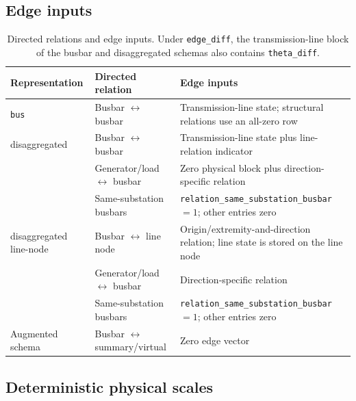 \subsection{Edge inputs}
\label{sec:gnn-edge-input-inventory}

\begin{table}[H]
  \centering
  \scriptsize
  \caption{Directed relations and edge inputs. Under \texttt{edge\_diff},
  the transmission-line block of the busbar and disaggregated schemas also
  contains \texttt{theta\_diff}.}
  \label{tab:gine-gat-edge-inventory}
  \label{tab:graph-edge-features}
  \label{tab:heterogeneous-edge-features}
  \label{tab:heterogeneous-line-edge-features}
  \label{tab:same-substation-augmentation-features}
  \setlength{\tabcolsep}{3pt}
  \begin{tabular}{L{0.18\textwidth}L{0.28\textwidth}L{0.45\textwidth}}
    \toprule
    Representation & Directed relation & Edge inputs \\
    \midrule
    \texttt{bus} & Busbar $\leftrightarrow$ busbar & Transmission-line state; structural relations use an all-zero row \\
    \midrule
    disaggregated & Busbar $\leftrightarrow$ busbar & Transmission-line state plus line-relation indicator \\
     & Generator/load $\leftrightarrow$ busbar & Zero physical block plus direction-specific relation \\
     & Same-substation busbars & \texttt{relation\_same\_substation\_busbar}$=1$; other entries zero \\
    \midrule
    disaggregated line-node & Busbar $\leftrightarrow$ line node & Origin/extremity-and-direction relation; line state is stored on the line node \\
     & Generator/load $\leftrightarrow$ busbar & Direction-specific relation \\
     & Same-substation busbars & \texttt{relation\_same\_substation\_busbar}$=1$; other entries zero \\
    \midrule
    Augmented schema & Busbar $\leftrightarrow$ summary/virtual & Zero edge vector \\
    \bottomrule
  \end{tabular}
\end{table}

\subsection{Deterministic physical scales}
\label{app:physical-scales}

